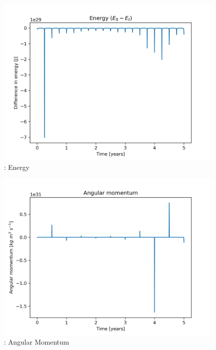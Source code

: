 \documentclass{article}
\begin{document}
\begin{figure}[H]
    \begin{center}
        \includegraphics[width=\textwidth]{./Plot/energy.png}
        \caption{: Energy}
        \label{fig:energy}
    \end{center}
\end{figure}

\begin{figure}[H]
    \begin{center}
        \includegraphics[width=\textwidth]{./Plot/angular_momentum.png}
        \caption{: Angular Momentum}
        \label{fig:am}
    \end{center}
\end{figure}
\end{document}
